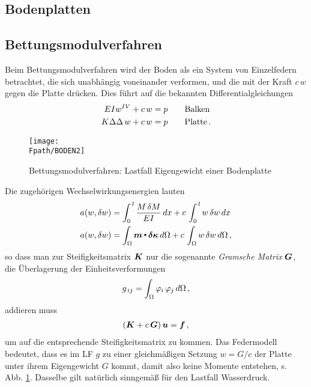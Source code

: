 \vspace{-0.5cm}
{\textcolor{sectionTitleBlue}{\section{Bodenplatten}}}\label{Bodenplatten}

{\textcolor{sectionTitleBlue}{\subsection{Bettungsmodulverfahren}}}
Beim Bettungsmodulverfahren wird der Boden als ein System von Einzelfedern betrachtet, die sich unabh\"{a}ngig voneinander verformen, und die mit der Kraft $c\,w$ gegen die Platte dr\"{u}cken. Dies f\"{u}hrt auf die bekannten Differentialgleichungen
\begin{align}
EI w^{IV} + c\, w &= p \qquad \mbox{Balken} \nonumber \\
K \Delta \Delta \, w + c\, w &= p \qquad\mbox{Platte}\nonumber\,.
\end{align}
\begin{figure}[tbp]
\centering
\if {} \sidecaption \fi
\texttt{[image: \\Fpath/BODEN2]}
\caption{Bettungsmodulver\-fah\-ren: Lastfall Eigengewicht einer Bodenplatte}
\label{Boden2}
\end{figure}%
Die  zugeh\"{o}rigen Wechselwirkungsenergien lauten
\begin{align}
a(w,\delta w) &= \int_0^{\,l} \frac{M\, \delta M}{EI}\,dx + c\,\int_0^{\,l} w\,\delta w\,dx \\
a(w,\delta w) &= \int_{\Omega} \mbox{\boldmath $m$} {\,\scriptscriptstyle \stackrel{\bullet}{{}}}\, \mbox{\boldmath $\delta$} \mbox{\boldmath $\kappa$}\,d\Omega +
c\,\int_{\Omega} w\,\delta w\,d\Omega\,,
\end{align}
so dass man zur Steifigkeitsmatrix $\mbox{\boldmath $K$}$ nur die sogenannte {\em Gramsche Matrix}
$\mbox{\boldmath $G$}$, die \"{U}berlagerung der Einheitsverformungen
\begin{align}
g_{\,ij} = \int_\Omega \varphi_i\,\varphi_j\, d\Omega \,,
\end{align}
addieren muss
\begin{align}
(\mbox{\boldmath $K$} + c\,\mbox{\boldmath $G$})\, \mbox{\boldmath $u$} = \mbox{\boldmath $f$} \,,
\end{align}
um auf die entsprechende Steifigkeitsmatrix zu kommen. Das Federmodell bedeutet, dass es im LF $g$ zu einer gleichm\"{a}{\ss}igen Setzung $w = G/c$ der Platte unter ihrem Eigengewicht $G$ kommt, damit also keine Momente entstehen,  s. Abb. \ref{Boden2}. Dasselbe gilt nat\"{u}rlich sinngem\"{a}{\ss}
f\"{u}r den Lastfall Wasserdruck.

